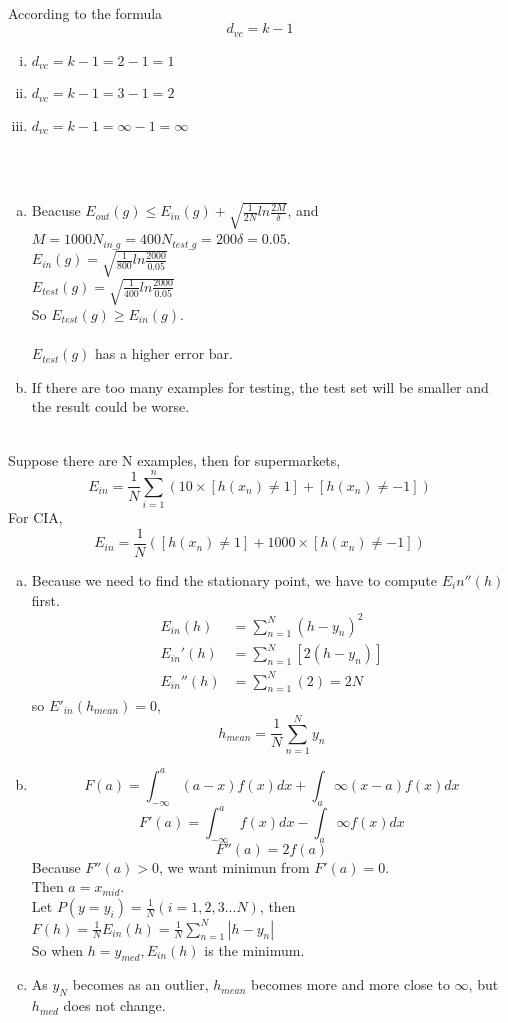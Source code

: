 \documentclass[11pt]{article}
\begin{document}
\\
According to the formula
\[
d_{vc}=k-1
\]
\begin{enumerate} [(i)]
\item $d_{vc}=k-1=2-1=1$
\item $d_{vc}=k-1=3-1=2$
\item $d_{vc}=k-1=\infty-1=\infty$
\end{enumerate}
\ \\\\
\begin{enumerate} [(a)]
\item Beacuse $E_{out}(g)\leq E_{in}(g)+ \sqrt{\frac{1}{2N}ln\frac{2M}{\delta}}$, and $M=1000 N_{in\_g}=400 N_{test\_g}=200 \delta=0.05$.\\
$E_{in}(g)=\sqrt{\frac{1}{800}ln\frac{2000}{0.05}}$\\
$E_{test}(g)=\sqrt{\frac{1}{400}ln\frac{2000}{0.05}}$\\
So $E_{test}(g)\geq E_{in}(g)$.\\\\
$E_{test}(g)$ has a higher error bar.

\item If there are too many examples for testing, the test set will be smaller and the result could be worse.
\end{enumerate}

\\
Suppose there are N examples, then for supermarkets,
\[
E_{in}=\frac{1}{N}\sum^{n}_{i=1}(10\times[h(x_n)\neq1]+[h(x_n)\neq-1])
\]
For CIA,
\[
E_{in}=\frac{1}{N}([h(x_n)\neq1]+1000\times[h(x_n)\neq-1])
\]
\newpage
{}
\begin{enumerate} [(a)]
\item Because we need to find the stationary point, we have to compute $E_in''(h)$ first.\\
\[
\begin{aligned}
E_{in}(h)&= \sum^{N}_{n=1}(h-y_n)^2\\
E_{in}'(h)&= \sum^{N}_{n=1}[2(h-y_n)]\\
E_{in}''(h)&= \sum^{N}_{n=1}(2)=2N
\end{aligned}
\]
so $E'_{in}(h_{mean})=0$,
\[
h_{mean}=\frac{1}{N}\sum^{N}_{n=1}y_n
\]

\item \[
F(a)= \int_{-\infty}^{a}(a-x)f(x)dx+\int_{a}{\infty}(x-a)f(x)dx
\]
\[
F'(a)= \int_{-\infty}^{a}f(x)dx-\int_{a}{\infty}f(x)dx
\]
\[
F''(a)=2f(a)
\]
Because $F''(a)>0$, we want minimun from $F'(a)=0$.\\
Then $a=x_{mid}$.\\
Let $P(y=y_i)=\frac{1}{N}(i=1,2,3...N)$, then
$F(h)=\frac{1}{N}E_{in}(h)=\frac{1}{N}\sum^N_{n=1}|h-y_n|$\\
So when $h=y_{med}, E_{in}(h)$ is the minimum.

\item As $y_N$ becomes as an outlier, $h_{mean}$ becomes more and more close to $\infty$, but $h_{med}$ does not change.
\end{enumerate}
\end{document}
